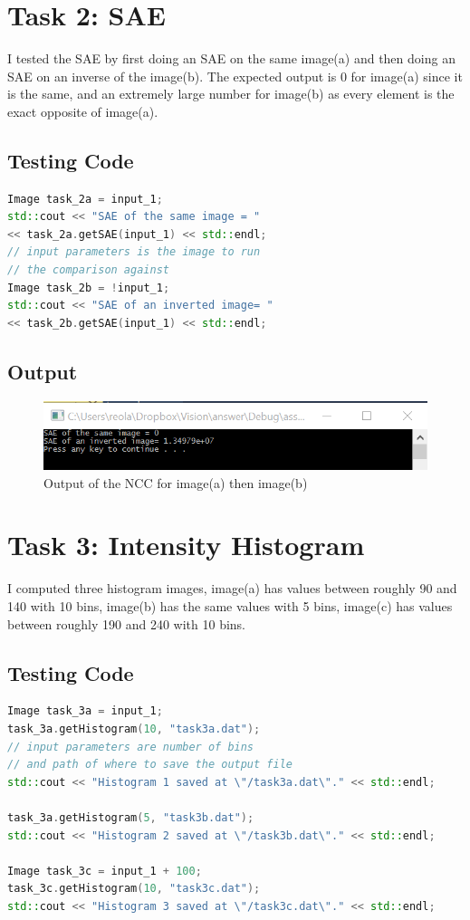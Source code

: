 \documentclass[pdftex,a4paper,10pt,titlepage]{article}
\begin{document}
\section {Task 2: SAE}
I tested the SAE by first doing an SAE on the same image(a) and then doing an SAE on an inverse of the image(b). The expected output is 0 for image(a) since it is the same, and an extremely large number for image(b) as every element is the exact opposite of image(a). 

\subsection{Testing Code}
\begin{lstlisting}[language=C++]
Image task_2a = input_1;
std::cout << "SAE of the same image = " 
<< task_2a.getSAE(input_1) << std::endl;
// input parameters is the image to run
// the comparison against
Image task_2b = !input_1;
std::cout << "SAE of an inverted image= " 
<< task_2b.getSAE(input_1) << std::endl;
\end{lstlisting}

\subsection{Output}
\begin{figure}[h]
\center
\includegraphics{Task2.PNG} 
\caption {Output of the NCC for image(a) then image(b)}
\label{fig:copied_image}
\end{figure}

\pagebreak

\section{Task 3: Intensity Histogram}
I computed three histogram images, image(a) has values between roughly 90 and 140 with 10 bins, image(b) has the same values with 5 bins, image(c) has values between roughly 190 and 240 with 10 bins.

\subsection{Testing Code}
\begin{lstlisting}[language=C++]
Image task_3a = input_1;
task_3a.getHistogram(10, "task3a.dat");
// input parameters are number of bins 
// and path of where to save the output file
std::cout << "Histogram 1 saved at \"/task3a.dat\"." << std::endl;

task_3a.getHistogram(5, "task3b.dat");
std::cout << "Histogram 2 saved at \"/task3b.dat\"." << std::endl;

Image task_3c = input_1 + 100;
task_3c.getHistogram(10, "task3c.dat");
std::cout << "Histogram 3 saved at \"/task3c.dat\"." << std::endl;
\end{lstlisting}
\end{document}
